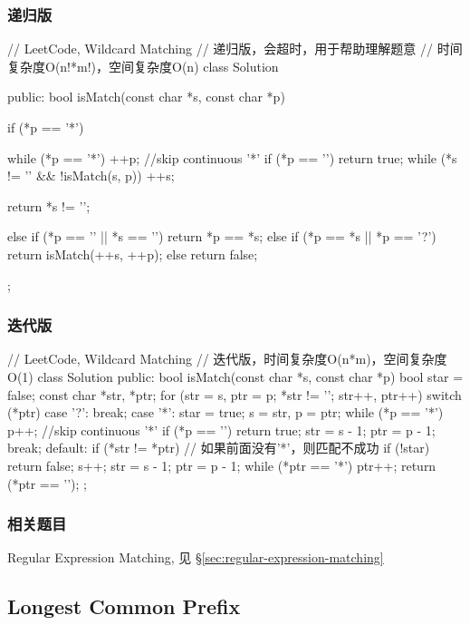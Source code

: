 \subsubsection{递归版}
\begin{Code}
	// LeetCode, Wildcard Matching
	// 递归版，会超时，用于帮助理解题意
	// 时间复杂度O(n!*m!)，空间复杂度O(n)
	class Solution {
		public:
		bool isMatch(const char *s, const char *p) {
			if (*p == '*') {
				while (*p == '*') ++p;  //skip continuous '*'
				if (*p == '\0') return true;
				while (*s != '\0' && !isMatch(s, p)) ++s;
				
				return *s != '\0';
			}
			else if (*p == '\0' || *s == '\0') return *p == *s;
			else if (*p == *s || *p == '?') return isMatch(++s, ++p);
			else return false;
		}
	};
\end{Code}


\subsubsection{迭代版}
\begin{Code}
	// LeetCode, Wildcard Matching
	// 迭代版，时间复杂度O(n*m)，空间复杂度O(1)
	class Solution {
		public:
		bool isMatch(const char *s, const char *p) {
			bool star = false;
			const char *str, *ptr;
			for (str = s, ptr = p; *str != '\0'; str++, ptr++) {
				switch (*ptr) {
					case '?':
					break;
					case '*':
					star = true;
					s = str, p = ptr;
					while (*p == '*') p++;  //skip continuous '*'
					if (*p == '\0') return true;
					str = s - 1;
					ptr = p - 1;
					break;
					default:
					if (*str != *ptr) {
						// 如果前面没有'*'，则匹配不成功
						if (!star) return false;
						s++;
						str = s - 1;
						ptr = p - 1;
					}
				}
			}
			while (*ptr == '*') ptr++;
			return (*ptr == '\0');
		}
	};
\end{Code}


\subsubsection{相关题目}
\begindot
\item Regular Expression Matching, 见 \S \ref{sec:regular-expression-matching}
\myenddot


\subsection{Longest Common Prefix} %
\label{sec:longest-common-prefix}


